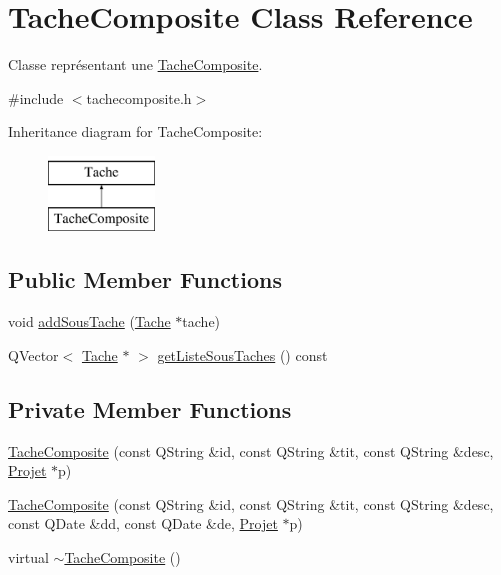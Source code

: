 \hypertarget{class_tache_composite}{}\section{Tache\+Composite Class Reference}
\label{class_tache_composite}


Classe représentant une \hyperlink{class_tache_composite}{Tache\+Composite}.  




{\ttfamily \#include $<$tachecomposite.\+h$>$}

Inheritance diagram for Tache\+Composite\+:\begin{figure}[H]
\begin{center}
\leavevmode
\includegraphics[height=2.000000cm]{class_tache_composite}
\end{center}
\end{figure}
\subsection*{Public Member Functions}
\begin{DoxyCompactItemize}
\item 
void \hyperlink{class_tache_composite_ab4243a926687c17556eeaa34ecbe1567}{add\+Sous\+Tache} (\hyperlink{class_tache}{Tache} $\ast$tache)
\item 
Q\+Vector$<$ \hyperlink{class_tache}{Tache} $\ast$ $>$ \hyperlink{class_tache_composite_a4c7408084fe783835b083501757a1c19}{get\+Liste\+Sous\+Taches} () const 
\end{DoxyCompactItemize}
\subsection*{Private Member Functions}
\begin{DoxyCompactItemize}
\item 
\hyperlink{class_tache_composite_a3042d6bf7df70fe0e56f314224fbae53}{Tache\+Composite} (const Q\+String \&id, const Q\+String \&tit, const Q\+String \&desc, \hyperlink{class_projet}{Projet} $\ast$p)
\item 
\hyperlink{class_tache_composite_a073e2621c0bc6cf8e61e2ef6f5e938eb}{Tache\+Composite} (const Q\+String \&id, const Q\+String \&tit, const Q\+String \&desc, const Q\+Date \&dd, const Q\+Date \&de, \hyperlink{class_projet}{Projet} $\ast$p)
\item 
virtual \hyperlink{class_tache_composite_a70ddee42aa910b22a06e8197f5873698}{$\sim$\+Tache\+Composite} ()
\end{DoxyCompactItemize}
